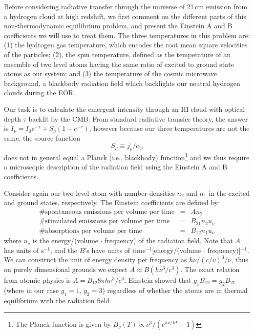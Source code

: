 Before considering radiative transfer through the universe of 21\,cm emission from a hydrogen cloud at high redshift, we first comment on the different parts of this non-thermodynamic equilibrium problem, and present the Einstein A and B coefficients we will use to treat them. The three temperatures in this problem are: (1) the hydrogen gas temperature, which encodes the root mean square velocities of the particles; (2), the spin temperature, defined as the temperature of an ensemble of two level atoms having the same ratio of excited to ground state atoms as our system; and (3) the temperature of the cosmic microwave background, a blackbody radiation field which backlights our neutral hydrogen clouds during the EOR. 

Our task is to calculate the emergent intensity through an HI cloud with optical depth $\tau$ backlit by the CMB. From standard radiative transfer theory, the answer is $I_\nu=I_0e^{-\tau}+S_\nu(1-e^{-\tau})$, however because our three temperatures are not the same, the source function 
\begin{equation}
S_\nu\equiv j_\nu/\alpha_\nu	
\end{equation}
does not in general equal a Planck (i.e., blackbody) function\footnote{The Planck function is given by $B_\nu(T)\propto\nu^3/(e^{h\nu/kT}-1)$} and we thus require a microscopic description of the radiation field using the Einstein A and B coefficients.

Consider again our two level atom with number densities $n_2$ and $n_1$ in the excited and ground states, respectively. The Einstein coefficients are defined by:
\begin{eqnarray}
\text{\# spontaneous emissions per volume per time}&=&An_2 \nonumber\\
\text{\# stimulated emissions per volume per time}&=&B_{21}n_2u_\nu \nonumber\\
\text{\# absorptions per volume per time}&=&B_{12}n_1u_\nu 
\end{eqnarray}
where $u_\nu$ is the energy/(volume $\cdot$ frequency) of the radiation field. Note that $A$ has units of $\text{s}^{-1}$, and the $B$'s have units of time$^{-1}$[energy/(volume $\cdot$ frequency)]$^{-1}$. We can construct the unit of energy density per frequency as $h\nu/(c/\nu)^3/\nu$, thus on purely dimensional grounds we expect $A\approx B (h\nu^3/c^3)$. The exact relation from atomic physics is $A=B_{12}8\pi h \nu^3/c^3$. Einstein showed that $g_1B_{12}=g_2B_{21}$ (where in our case $g_1=1$, $g_2=3$) regardless of whether the atoms are in thermal equilibrium with the radiation field.

